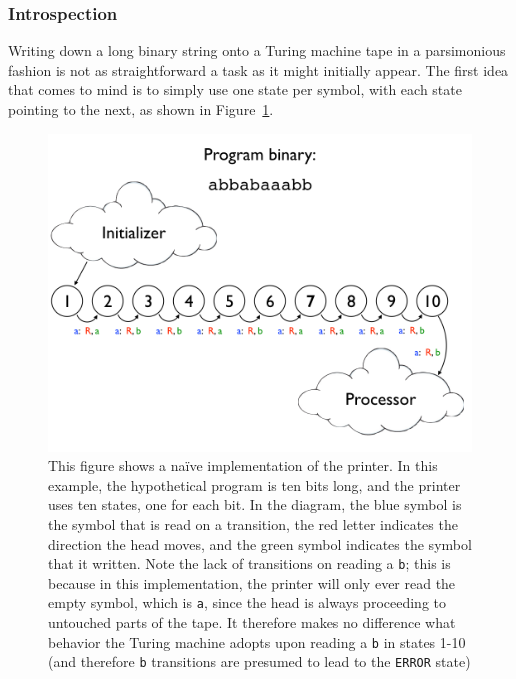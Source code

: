 \documentclass[11pt]{article}
\begin{document}
\subsubsection{Introspection}

Writing down a long binary string onto a Turing machine tape in a parsimonious fashion is not as straightforward a task as it might initially appear. The first idea that comes to mind is to simply use one state per symbol, with each state pointing to the next, as shown in Figure~\ref{fig:naiveprog}. \\

\begin{figure}
\begin{center}
\includegraphics[scale=0.42]{figs/naiveprog.png}
\caption{This figure shows a na\"ive implementation of the printer. In this example, the hypothetical program is ten bits long, and the printer uses ten states, one for each bit. In the diagram, the blue symbol is the symbol that is read on a transition, the red letter indicates the direction the head moves, and the green symbol indicates the symbol that it written. Note the lack of transitions on reading a \texttt{b}; this is because in this implementation, the printer will only ever read the empty symbol, which is \texttt{a}, since the head is always proceeding to untouched parts of the tape. It therefore makes no difference what behavior the Turing machine adopts upon reading a \texttt{b} in states 1-10 (and therefore \texttt{b} transitions are presumed to lead to the \texttt{ERROR} state) \label{fig:naiveprog}}
\end{center}
\end{figure}
\end{document}
